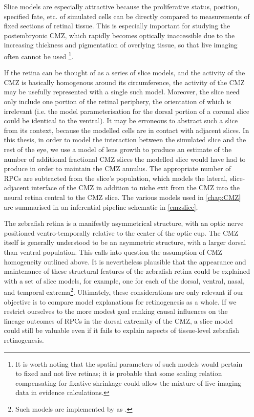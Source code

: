 \documentclass{ut-thesis}
\begin{document}
\begin{NoHyper}
Slice models are especially attractive because the proliferative status, position, specified fate, etc. of simulated cells can be directly compared to measurements of fixed sections of retinal tissue. This is especially important for studying the postembryonic CMZ, which rapidly becomes optically inaccessible due to the increasing thickness and pigmentation of overlying tissue, so that live imaging often cannot be used \footnote{It is worth noting that the spatial parameters of such models would pertain to fixed and not live retinas; it is probable that some scaling relation compensating for fixative shrinkage could allow the mixture of live imaging data in evidence calculations.}.

If the retina can be thought of as a series of slice models, and the activity of the CMZ is basically homogenous around its circumference, the activity of the CMZ may be usefully represented with a single such model. Moreover, the slice need only include one portion of the retinal periphery, the orientation of which is irrelevant (i.e. the model parameterisation for the dorsal portion of a coronal slice could be identical to the ventral). It may be erroneous to abstract such a slice from its context, because the modelled cells are in contact with adjacent slices. In this thesis, in order to model the interaction between the simulated slice and the rest of the eye, we use a model of lens growth to produce an estimate of the number of additional fractional CMZ slices the modelled slice would have had to produce in order to maintain the CMZ annulus. The appropriate number of RPCs are subtracted from the slice's population, which models the lateral, slice-adjacent interface of the CMZ in addition to niche exit from the CMZ into the neural retina central to the CMZ slice. The various models used in \autoref{chap:CMZ} are summarised in an inferential pipeline schematic in \autoref{cmzslice}.

The zebrafish retina is a manifestly asymmetrical structure, with an optic nerve positioned ventro-temporally relative to the center of the optic cup. The CMZ itself is generally understood to be an asymmetric structure, with a larger dorsal than ventral population. This calls into question the assumption of CMZ homogeneity outlined above. It is nevertheless plausible that the appearance and maintenance of these structural features of the zebrafish retina could be explained with a set of slice models, for example, one for each of the dorsal, ventral, nasal, and temporal extrema\footnote{Such models are implemented by \hyperref[chap:CNS]{} as .}. Ultimately, these considerations are only relevant if our objective is to compare model explanations for retinogenesis as a whole. If we restrict ourselves to the more modest goal ranking causal influences on the lineage outcomes of RPCs in the dorsal extremity of the CMZ, a slice model could still be valuable even if it fails to explain aspects of tissue-level zebrafish retinogenesis.


\end{NoHyper}
\end{document}
